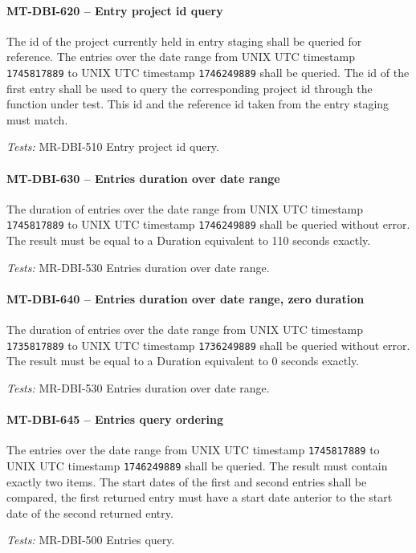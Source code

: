\paragraph{MT-DBI-620 -- Entry project id query}
The id of the project currently held in entry staging shall be queried for
reference.
The entries over the date range from UNIX UTC timestamp
\lstinline{1745817889} to UNIX UTC timestamp \lstinline{1746249889}
shall be queried. The id of the first entry shall be used
to query the corresponding project id through the function under
test.
This id and the reference id taken from the entry staging must match.

\textit{Tests: } MR-DBI-510 Entry project id query.

\paragraph{MT-DBI-630 -- Entries duration over date range}
The duration of entries over the date range from UNIX UTC timestamp
\lstinline{1745817889} to UNIX UTC timestamp \lstinline{1746249889}
shall be queried without error.
The result must be equal to a Duration equivalent to 110 seconds
exactly.

\textit{Tests: } MR-DBI-530 Entries duration over date range.

\paragraph{MT-DBI-640 -- Entries duration over date range, zero duration}
The duration of entries over the date range from UNIX UTC timestamp
\lstinline{1735817889} to UNIX UTC timestamp \lstinline{1736249889}
shall be queried without error.
The result must be equal to a Duration equivalent to 0 seconds
exactly.

\textit{Tests: } MR-DBI-530 Entries duration over date range.

\paragraph{MT-DBI-645 -- Entries query ordering}
The entries over the date range from UNIX UTC timestamp
\lstinline{1745817889} to UNIX UTC timestamp \lstinline{1746249889}
shall be queried. The result must contain exactly two items.
The start dates of the first and second entries shall be compared,
the first returned entry must have a start date anterior to
the start date of the second returned entry.

\textit{Tests: } MR-DBI-500 Entries query.

